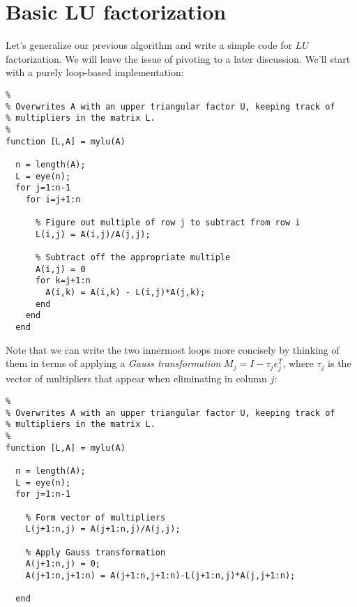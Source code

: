 \section{Basic LU factorization}

Let's generalize our previous algorithm and write a simple code for
$LU$ factorization.  We will leave the issue of pivoting to a later
discussion.  We'll start with a purely loop-based implementation:
\begin{lstlisting}
%
% Overwrites A with an upper triangular factor U, keeping track of
% multipliers in the matrix L.
%
function [L,A] = mylu(A)

  n = length(A);
  L = eye(n);
  for j=1:n-1
    for i=j+1:n

      % Figure out multiple of row j to subtract from row i
      L(i,j) = A(i,j)/A(j,j);

      % Subtract off the appropriate multiple
      A(i,j) = 0
      for k=j+1:n
        A(i,k) = A(i,k) - L(i,j)*A(j,k);
      end
    end
  end
\end{lstlisting}
Note that we can write the two innermost loops more concisely by
thinking of them in terms of applying a {\em Gauss
  transformation} $M_j = I - \tau_j e_j^T$, where $\tau_j$ is the
vector of multipliers that appear when eliminating in column $j$:
\begin{lstlisting}
%
% Overwrites A with an upper triangular factor U, keeping track of
% multipliers in the matrix L.
%
function [L,A] = mylu(A)

  n = length(A);
  L = eye(n);
  for j=1:n-1

    % Form vector of multipliers
    L(j+1:n,j) = A(j+1:n,j)/A(j,j);

    % Apply Gauss transformation
    A(j+1:n,j) = 0;
    A(j+1:n,j+1:n) = A(j+1:n,j+1:n)-L(j+1:n,j)*A(j,j+1:n);

  end
\end{lstlisting}
